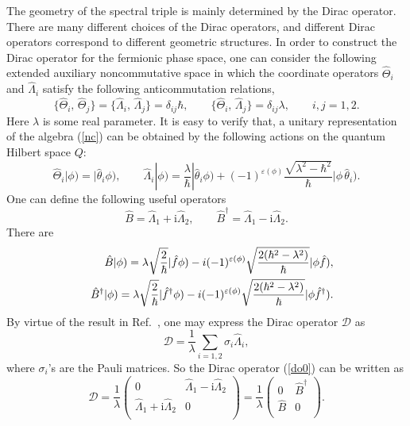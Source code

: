 \documentclass[a4paper,12pt]{article}
\begin{document}
The geometry of the spectral triple is mainly determined by the Dirac operator. There are many different choices of the Dirac operators, and different Dirac operators correspond to different geometric structures.
In order to construct the Dirac operator for the fermionic phase space, one can consider the following extended auxiliary noncommutative space in which the coordinate operators $\hat{\Theta}_i$ and $\hat{\Lambda}_i$ satisfy the following anticommutation relations,
\begin{equation}\label{nc}
	\{\hat{\Theta}_i,\,\hat{\Theta}_j\}
	=\{\hat{\Lambda}_i,\,\hat{\Lambda}_j\}=\delta_{ij}\hbar,\qquad
	\{\hat{\Theta}_i,\,\hat{\Lambda}_j\}=\delta_{ij}\lambda,\qquad
	i,j=1,2.
\end{equation}
Here $\lambda$ is some real parameter.
It is easy to verify that, a unitary representation of the algebra (\ref{nc}) can be obtained by the following actions on the quantum Hilbert space $Q$:
\begin{equation}
	\hat{\Theta}_i|\phi)=|\hat{\theta}_i\phi),\qquad
	\hat{\Lambda}_i|\phi)
	=\frac{\lambda}{\hbar}|\hat{\theta}_i\phi)
	+(-1)^{\varepsilon(\phi)}
	\frac{\sqrt{\lambda^2-\hbar^2}}{\hbar}|\phi\,\hat{\theta}_i).
\end{equation}
One can define the following useful operators
\begin{equation}
	\hat{B}=\hat{\Lambda}_{1}+\mathrm{i}\hat{\Lambda}_{2},\qquad
	\hat{B}^\dag=\hat{\Lambda}_{1}-\mathrm{i}\hat{\Lambda}_{2}.
\end{equation}
There are
\begin{eqnarray}
	&&\hat{B}|\phi)=\lambda\sqrt{\frac{2}{\hbar}}|\hat{f}\phi)
	-{\rm i}(-1)^{\varepsilon(\phi)}
	\sqrt{\frac{2(\hbar^2-\lambda^2)}{\hbar}}|\phi\hat{f}),\nonumber\\
	&&\hat{B}^\dag|\phi)=\lambda\sqrt{\frac{2}{\hbar}}|\hat{f}^\dag\phi)
	-{\rm i}(-1)^{\varepsilon(\phi)}
	\sqrt{\frac{2(\hbar^2-\lambda^2)}{\hbar}}|\phi\hat{f}^\dag).
\end{eqnarray}
By virtue of the result in Ref.~\cite{Gayral}, one may express the Dirac operator $\mathcal{D}$ as
\begin{equation}\label{do0}
	\mathcal{D}
	=\frac{1}{\lambda}\sum_{i=1,2}\sigma_i\hat{\Lambda}_i,
\end{equation}
where $\sigma_i$'s are the Pauli matrices.
So the Dirac operator (\ref{do0}) can be written as
\begin{equation}
	\mathcal{D}
	=\frac{1}{\lambda}\left(
	\begin{array}{cc}
		0 &\hat{\Lambda}_1-\mathrm{i}\hat{\Lambda}_2 \\
		\hat{\Lambda}_1+\mathrm{i}\hat{\Lambda}_2 & 0 \\
	\end{array}\right)
	=\frac{1}{\lambda}\left(
	\begin{array}{cc}
		0 &\hat{B}^\dag \\
		\hat{B} & 0 \\
	\end{array}\right).
\end{equation}
\end{document}
